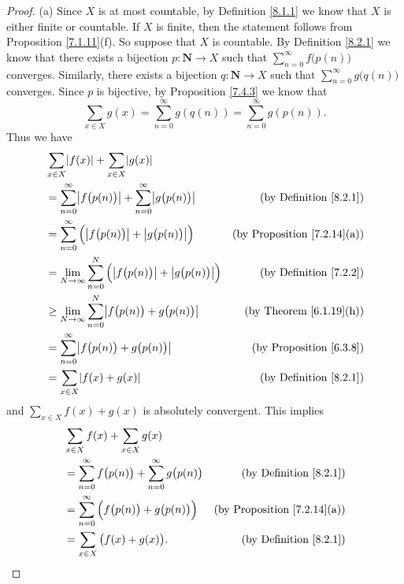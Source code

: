 \begin{proof}{(a)}
    Since \(X\) is at most countable, by Definition \ref{8.1.1} we know that \(X\) is either finite or countable.
    If \(X\) is finite, then the statement follows from Proposition \ref{7.1.11}(f).
    So suppose that \(X\) is countable.
    By Definition \ref{8.2.1} we know that there exists a bijection \(p : \mathbf{N} \to X\) such that \(\sum_{n = 0}^\infty f\big(p(n)\big)\) converges.
    Similarly, there exists a bijection \(q : \mathbf{N} \to X\) such that \(\sum_{n = 0}^\infty g\big(q(n)\big)\) converges.
    Since \(p\) is bijective, by Proposition \ref{7.4.3} we know that
    \[
        \sum_{x \in X} g(x) = \sum_{n = 0}^\infty g(q(n)) = \sum_{n = 0}^\infty g(p(n)).
    \]
    Thus we have
    \begin{align*}
         & \sum_{x \in X} \abs*{f(x)} + \sum_{x \in X} \abs*{g(x)}                                                                                  \\
         & = \sum_{n = 0}^\infty \abs*{f\big(p(n)\big)} + \sum_{n = 0}^\infty \abs*{g\big(p(n)\big)}      & \text{(by Definition \ref{8.2.1})}      \\
         & = \sum_{n = 0}^\infty \Big(\abs*{f\big(p(n)\big)} + \abs*{g\big(p(n)\big)}\Big)                & \text{(by Proposition \ref{7.2.14}(a))} \\
         & = \lim_{N \to \infty} \sum_{n = 0}^N \Big(\abs*{f\big(p(n)\big)} + \abs*{g\big(p(n)\big)}\Big) & \text{(by Definition \ref{7.2.2})}      \\
         & \geq \lim_{N \to \infty} \sum_{n = 0}^N \abs*{f\big(p(n)\big) + g\big(p(n)\big)}               & \text{(by Theorem \ref{6.1.19}(h))}     \\
         & = \sum_{n = 0}^\infty \abs*{f\big(p(n)\big) + g\big(p(n)\big)}                                 & \text{(by Proposition \ref{6.3.8})}     \\
         & = \sum_{x \in X} \abs*{f(x) + g(x)}                                                            & \text{(by Definition \ref{8.2.1})}
    \end{align*}
    and \(\sum_{x \in X} f(x) + g(x)\) is absolutely convergent.
    This implies
    \begin{align*}
         & \sum_{x \in X} f(x) + \sum_{x \in X} g(x)                                                                             \\
         & = \sum_{n = 0}^\infty f\big(p(n)\big) + \sum_{n = 0}^\infty g\big(p(n)\big) & \text{(by Definition \ref{8.2.1})}      \\
         & = \sum_{n = 0}^\infty \Big(f\big(p(n)\big) + g\big(p(n)\big)\Big)           & \text{(by Proposition \ref{7.2.14}(a))} \\
         & = \sum_{x \in X} \big(f(x) + g(x)\big).                                     & \text{(by Definition \ref{8.2.1})}
    \end{align*}
\end{proof}

